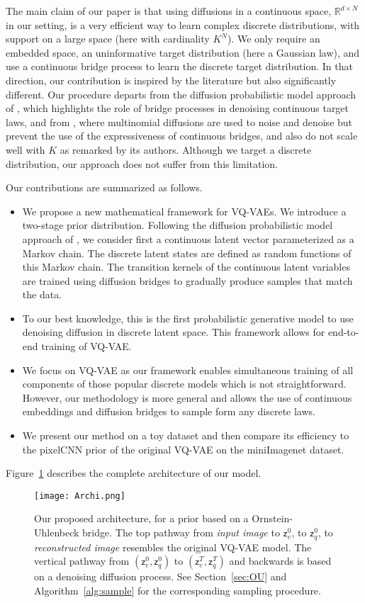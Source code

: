 \documentclass{article}
\theoremstyle{plain}
\theoremstyle{definition}
\theoremstyle{remark}
\newcommand{\latentcont}{\mathsf{z}_e}
\newcommand{\latentdis}{\mathsf{z}_q}
\begin{document}
 The main claim of our paper is that using diffusions in a continuous space,  $\mathbb{R}^{d \times N}$ in our setting, is a very efficient way to learn complex discrete distributions, with support on a large space (here with cardinality $K^N$). We only require an embedded space, an uninformative target distribution (here a Gaussian law), and use a continuous bridge process to learn the discrete target distribution. In that direction, our contribution is inspired by the literature but also significantly different. Our procedure departs from the diffusion probabilistic model approach of \cite{ho2020denoising}, which highlights the role of bridge processes in denoising continuous target laws, and from \cite{hoogeboom2021argmax},  where multinomial diffusions are used to noise and denoise but prevent the use of the expressiveness of continuous bridges, and also do not scale well with $K$ as remarked by its authors. Although we target a discrete distribution, our approach does not suffer from this limitation.

 Our contributions are summarized as follows.
\begin{itemize}
    \item We propose a new mathematical framework for VQ-VAEs. We introduce a two-stage prior distribution. Following the diffusion probabilistic model approach of \cite{ho2020denoising}, we consider first a continuous latent vector parameterized as a Markov chain. The discrete latent states are defined  as random functions of this Markov chain. The  transition kernels of the continuous latent variables are trained using diffusion bridges to gradually produce samples that match the data.
    \item  To our best knowledge, this is the first probabilistic generative model to use denoising diffusion in discrete latent space. This framework allows for end-to-end training of VQ-VAE.
    \item We focus on VQ-VAE as our framework enables simultaneous training of all components of those popular discrete models which is not straightforward. However, our methodology is  more general and allows the use of continuous embeddings and diffusion bridges to sample form any discrete laws.
    \item We present our method on a toy dataset and then compare its efficiency to the pixelCNN prior of the original VQ-VAE on the miniImagenet dataset.
\end{itemize}
Figure~\ref{fig:archi} describes the complete architecture of our model.
\begin{figure}[h]
    \centering
    \texttt{[image: Archi.png]}
    \caption{Our proposed architecture, for a prior based on a Ornstein-Uhlenbeck bridge. The top pathway from \textit{input image} to $\latentcont^0$, to $\latentdis^0$, to \textit{reconstructed image} resembles the original VQ-VAE model. The vertical pathway from $(\latentcont^0, \latentdis^0)$ to $(\latentcont^T, \latentdis^T)$ and backwards is based on a denoising diffusion process. See Section~\ref{sec:OU} and Algorithm~\ref{alg:sample} for the corresponding sampling procedure.}
    \label{fig:archi}
\end{figure}
\end{document}

